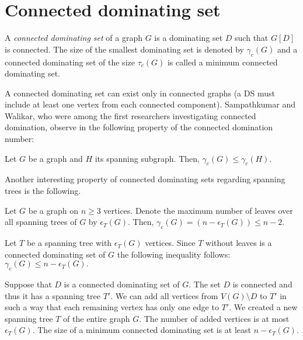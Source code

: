 \section{Connected dominating set}

\begin{defn}
	A \emph{connected dominating set} of a graph \(G\) is a dominating set \(D\) such that \(G[D]\) is connected.
	The size of the smallest dominating set is denoted by \(\gamma_c(G)\) and a connected dominating set of the size \(\tau_c(G)\) is called 
	a minimum connected dominating set.
\end{defn}

A connected dominating set can exist only in connected graphs (a DS must include at least one vertex from each connected component).
Sampathkumar and Walikar, who were among the first researchers investigating connected domination, observe in \cite{SampathkumarWalikar79}
the following property of the connected domination number:

\begin{thm}
	Let \(G\) be a graph and \(H\) its spanning subgraph.
	Then, \(\gamma_c(G) \leq \gamma_c(H)\).
\end{thm}

Another interesting property of connected dominating sets regarding spanning trees is the following.
\begin{thm}\cite{HedetniemiLaskar84}
	Let \(G\) be a graph on \(n \geq 3\) vertices.
	Denote the maximum number of leaves over all spanning trees of \(G\) by \(\epsilon_T(G)\).
	Then, \(\gamma_c(G) = {(n - \epsilon_T(G))} \leq n-2\).
\end{thm}

\begin{myproof}
	Let \(T\) be a spanning tree with \(\epsilon_T(G)\) vertices. Since \(T\) without leaves is a connected dominating set of \(G\)
	the following inequality follows: \(\gamma_c(G) \leq {n - \epsilon_T(G)}.\)
	
	Suppose that \(D\) is a connected dominating set of \(G\). 
	The set \(D\) is connected and thus it has a spanning tree \(T'\).
	We can add all vertices from \(V(G) \setminus D\) to \(T'\) in such a way that each remaining vertex has only one edge to \(T'\).
	We created a new spanning tree \(T\) of the entire graph \(G\). The number of added vertices is at most \(\epsilon_T(G)\).
	The size of a minimum connected dominating set is at least \({n - \epsilon_T(G)}\).
\end{myproof}

